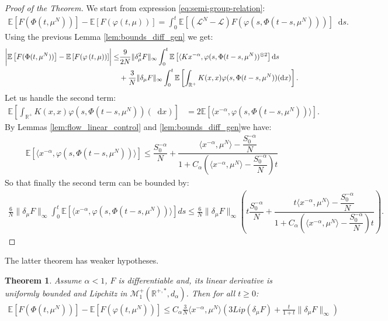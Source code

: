 \documentclass[11pt,a4paper]{article}
\newcommand{\RR}{\mathbb{R}}
\newcommand{\MC}{\mathcal{M}}
\newcommand{\LC}{\mathcal{L}}
\newcommand{\E}[1]{\mathbb{E}\left[#1\right]}
\newcommand{\dd}{\mathop{}\!\mathrm{d}}
\newtheorem{theorem}{Theorem}[section]
\begin{document}
\begin{proof}[Proof of the Theorem]
 We start from expression \eqref{eq:semi-group-relation}:
 \begin{align*}
\E{F(\Phi(t,\mu^N))} - \E{F(\varphi\left(t,\mu\right))} = \int_0^t \E{\left(\LC^N - \LC\right)F(\varphi(s,\Phi(t-s,\mu^N)))}\dd s.
\end{align*}
Using the previous Lemma \ref{lem:bounds_diff_gen} we get:
\begin{align*}
    \left|\vphantom{\dfrac{A}{A}} \E{F(\Phi(t,\mu^N))} - \E{F(\varphi\left(t,\mu\right))}\right| \leq&  \frac{9}{2N}\|\delta_\mu^2 F\|_{\infty}\int_0^t \E{ \langle Kx^{-\alpha} , \varphi(s,\Phi(t-s,\mu^N))^{\otimes 2}}\dd s\\
    &+ \frac{3}{N}\|\delta_\mu F\|_{\infty}\int_0^t\E{\int_{\RR^+} K(x,x)\varphi(s,\Phi(t-s,\mu^N))(\dd x)}.
\end{align*}
Let us handle the second term:
\begin{align*}
    \E{\int_{\RR^+} K(x,x)\varphi(s,\Phi(t-s,\mu^N))(\dd x)} 
    &=  2\E{\langle x^{-\alpha}, \varphi(s,\Phi(t-s,\mu^N))\rangle}.
\end{align*}
By Lemmas \ref{lem:flow_linear_control}  and \ref{lem:bounds_diff_gen}we have:
\begin{align*}
    \E{\langle x^{-\alpha}, \varphi(s,\Phi(t-s,\mu^N))\rangle} \leq \dfrac{S_0^{-\alpha}}{N} + \dfrac{\langle x^{-\alpha},\mu^N \rangle - \dfrac{S_0^{-\alpha}}{N}}{1 + C_\alpha \left(\langle x^{-\alpha},\mu^N \rangle - \dfrac{S_0^{-\alpha}}{N}\right)t}
\end{align*}
So that finally the second term can be bounded by:
\begin{multline*}
    \frac{6}{N}\|\delta_\mu F\|_{\infty}\int_0^t\E{\langle x^{-\alpha}, \varphi(s,\Phi(t-s,\mu^N))\rangle}ds \leq \frac{6}{N}\|\delta_\mu F\|_{\infty} \left( t\dfrac{S_0^{-\alpha}}{N} + \dfrac{t\langle x^{-\alpha},\mu^N \rangle - \dfrac{S_0^{-\alpha}}{N}}{1 + C_\alpha \left(\langle x^{-\alpha},\mu^N \rangle - \dfrac{S_0^{-\alpha}}{N}\right)t}\right).
\end{multline*}
\end{proof}

The latter theorem has weaker hypotheses.
\begin{theorem}
    Assume $\alpha < 1$, $F$ is differentiable and, its linear derivative is uniformly bounded and Lipchitz in $\MC^{+}_{1}\left(\RR^{+,*},d_\alpha\right)$. Then for all $t\geq 0$:
    \begin{align*}
        \E{F(\Phi(t,\mu^N))} - \E{F(\varphi\left(t,\mu^N\right))} \leq C_\alpha\frac{3}{N}\langle x^{-\alpha},\mu^N \rangle \left(3 Lip\left(\delta_\mu F\right) + \frac{t}{1 + t}\|\delta_\mu F\|_{\infty}\right)
    \end{align*}
\end{theorem}
\end{document}
